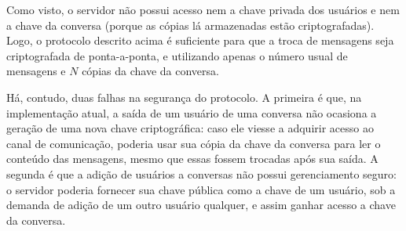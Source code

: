 \documentclass[../main.tex]{subfiles}
\begin{document}
Como visto, o servidor não possui acesso nem a chave privada dos usuários e nem a chave da conversa (porque as cópias lá armazenadas estão criptografadas).
Logo, o protocolo descrito acima é suficiente para que a troca de mensagens seja criptografada de ponta-a-ponta, e utilizando apenas o número usual de mensagens e $N$ cópias da chave da conversa.

Há, contudo, duas falhas na segurança do protocolo.
A primeira é que, na implementação atual, a saída de um usuário de uma conversa não ocasiona a geração de uma nova chave criptográfica: caso ele viesse a adquirir acesso ao canal de comunicação, poderia usar sua cópia da chave da conversa para ler o conteúdo das mensagens, mesmo que essas fossem trocadas após sua saída.
A segunda é que a adição de usuários a conversas não possui gerenciamento seguro: o servidor poderia fornecer sua chave pública como a chave de um usuário, sob a demanda de adição de um outro usuário qualquer, e assim ganhar acesso a chave da conversa.
\end{document}
